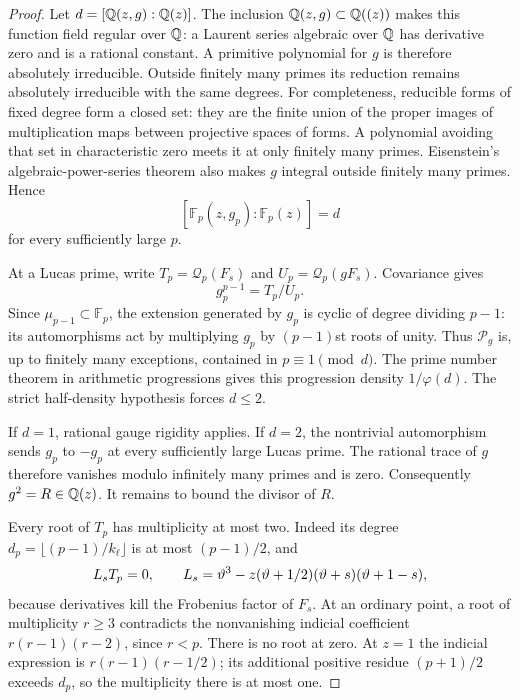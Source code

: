 \begin{proof}
Let $d=[\mathbb Q(z,g):\mathbb Q(z)]$. The inclusion
$\mathbb Q(z,g)\subset\mathbb Q((z))$ makes this function field regular over
$\mathbb Q$: a Laurent series algebraic over $\mathbb Q$ has derivative zero
and is a rational constant. A primitive polynomial for $g$ is
therefore absolutely irreducible. Outside finitely many primes its
reduction remains absolutely irreducible with the same degrees.
For completeness, reducible forms of fixed degree form a closed
set: they are the finite union of the proper images of multiplication
maps between projective spaces of forms. A polynomial avoiding that
set in characteristic zero meets it at only finitely many primes.
Eisenstein's algebraic-power-series theorem also makes $g$
integral outside finitely many primes. Hence
\begin{equation}\label{eq:C-gauge-degree-reduction}
 [\mathbb F_p(z,g_p):\mathbb F_p(z)]=d
\end{equation}
for every sufficiently large $p$.

At a Lucas prime, write $T_p=\mathcal Q_p(F_s)$ and
$U_p=\mathcal Q_p(gF_s)$. Covariance gives
\begin{equation}\label{eq:C-algebraic-gauge-kummer}
                    g_p^{p-1}=T_p/U_p.
\end{equation}
Since $\mu_{p-1}\subset\mathbb F_p$, the extension generated by
$g_p$ is cyclic of degree dividing $p-1$: its automorphisms act by
multiplying $g_p$ by $(p-1)$st roots of unity. Thus
$\mathcal P_g$ is, up to finitely many exceptions, contained in
$p\equiv1\pmod d$. The prime number theorem in arithmetic
progressions gives this progression density $1/\varphi(d)$.
The strict half-density hypothesis forces $d\le2$.

If $d=1$, rational gauge rigidity applies. If $d=2$, the nontrivial
automorphism sends $g_p$ to $-g_p$ at every sufficiently large
Lucas prime. The rational trace of $g$ therefore vanishes modulo
infinitely many primes and is zero. Consequently $g^2=R\in\mathbb Q(z)$.
It remains to bound the divisor of $R$.

Every root of $T_p$ has multiplicity at most two. Indeed its degree
$d_p=\lfloor(p-1)/k_\ell\rfloor$ is at most $(p-1)/2$, and
\[
 L_sT_p=0,\qquad
 L_s=\vartheta^3-z(\vartheta+1/2)(\vartheta+s)(\vartheta+1-s),
\]
because derivatives kill the Frobenius factor of $F_s$. At an
ordinary point, a root of multiplicity $r\ge3$ contradicts the
nonvanishing indicial coefficient $r(r-1)(r-2)$, since $r<p$.
There is no root at zero. At $z=1$ the indicial expression is
$r(r-1)(r-1/2)$; its additional positive residue $(p+1)/2$ exceeds
$d_p$, so the multiplicity there is at most one.


\end{proof}
